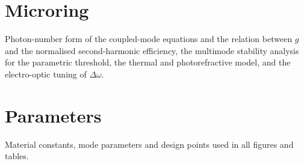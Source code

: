 \documentclass[aps,prapplied,onecolumn,superscriptaddress,longbibliography,nofootinbib]{revtex4-2}
\newcommand{\Dom}{\Delta\omega}
\begin{document}
\section{Microring}
Photon-number form of the coupled-mode equations and the relation between
$g$ and the normalised second-harmonic efficiency, the multimode stability
analysis for the parametric threshold, the thermal and photorefractive
model, and the electro-optic tuning of $\Dom$.

\section{Parameters}
Material constants, mode parameters and design points used in all
figures and tables.


\end{document}
